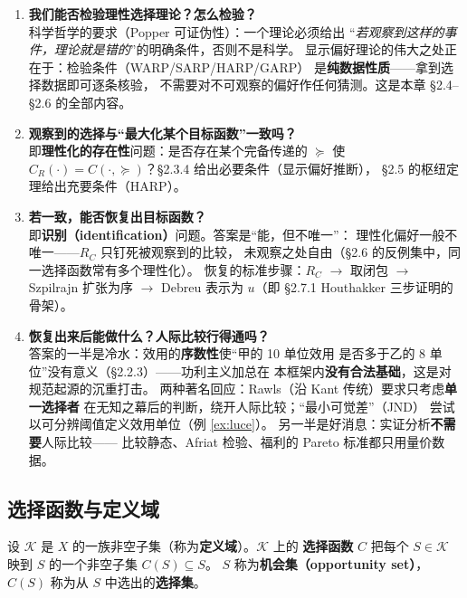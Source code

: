 \begin{enumerate}
  \item \textbf{我们能否检验理性选择理论？怎么检验？}\\
  科学哲学的要求（Popper 可证伪性）：一个理论必须给出
  “\emph{若观察到这样的事件，理论就是错的}”的明确条件，否则不是科学。
  显示偏好理论的伟大之处正在于：检验条件（WARP/SARP/HARP/GARP）
  是\textbf{纯数据性质}——拿到选择数据即可逐条核验，
  不需要对不可观察的偏好作任何猜测。这是本章 §2.4--§2.6 的全部内容。
  \item \textbf{观察到的选择与“最大化某个目标函数”一致吗？}\\
  即\textbf{理性化的存在性}问题：是否存在某个完备传递的 $\succeq$ 使
  $C_R(\cdot)=C(\cdot,\succeq)$？§2.3.4 给出必要条件（显示偏好推断），
  §2.5 的枢纽定理给出充要条件（HARP）。
  \item \textbf{若一致，能否恢复出目标函数？}\\
  即\textbf{识别（identification）}问题。答案是“能，但不唯一”：
  理性化偏好一般不唯一——$R_C$ 只钉死被观察到的比较，
  未观察之处自由（§2.6 的反例集中，同一选择函数常有多个理性化）。
  恢复的标准步骤：$R_C$ $\to$ 取闭包 $\to$ Szpilrajn 扩张为序
  $\to$ Debreu 表示为 $u$（即 §2.7.1 Houthakker 三步证明的骨架）。
  \item \textbf{恢复出来后能做什么？人际比较行得通吗？}\\
  答案的一半是冷水：效用的\textbf{序数性}使“甲的 10 单位效用
  是否多于乙的 8 单位”没有意义（§2.2.3）——功利主义加总在
  本框架内\textbf{没有合法基础}，这是对规范起源的沉重打击。
  两种著名回应：Rawls（沿 Kant 传统）要求只考虑\textbf{单一选择者}
  在无知之幕后的判断，绕开人际比较；“最小可觉差”（JND）
  尝试以可分辨阈值定义效用单位（例 \ref{ex:luce}）。
  另一半是好消息：实证分析\textbf{不需要}人际比较——
  比较静态、Afriat 检验、福利的 Pareto 标准都只用量价数据。
\end{enumerate}

\subsection{选择函数与定义域}

\begin{definition}[选择函数与选择集]
设 $\mathcal{K}$ 是 $X$ 的一族非空子集（称为\textbf{定义域}）。$\mathcal{K}$ 上的
\textbf{选择函数} $C$ 把每个 $S\in\mathcal{K}$ 映到 $S$ 的一个非空子集 $C(S)\subseteq S$。
$S$ 称为\textbf{机会集（opportunity set）}，$C(S)$ 称为从 $S$ 中选出的\textbf{选择集}。
\end{definition}

